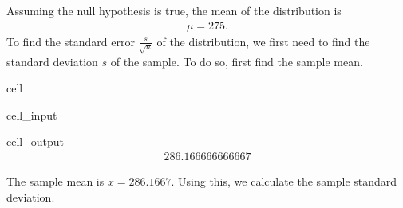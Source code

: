 \documentclass[letterpaper,10pt,english]{jupyterBook}
\begin{document}
\sphinxAtStartPar
Assuming the null hypothesis is true, the mean of the distribution is
\begin{equation*}
\begin{split} \mu = 275. \end{split}
\end{equation*}
\sphinxAtStartPar
To find the standard error \(\frac{s}{\sqrt{n}}\) of the distribution, we first need to find the standard deviation \(s\) of the sample. To do so, first find the sample mean.

\begin{sphinxuseclass}{cell}\begin{sphinxVerbatimInput}

\begin{sphinxuseclass}{cell_input}
\begin{sphinxVerbatim}[commandchars=\\\{\}]

\end{sphinxVerbatim}

\end{sphinxuseclass}\end{sphinxVerbatimInput}
\begin{sphinxVerbatimOutput}

\begin{sphinxuseclass}{cell_output}\begin{equation*}
\begin{split}286.166666666667\end{split}
\end{equation*}
\end{sphinxuseclass}\end{sphinxVerbatimOutput}

\end{sphinxuseclass}
\sphinxAtStartPar
The sample mean is \(\bar{x} = 286.1667\). Using this, we calculate the sample standard deviation.
\end{document}
